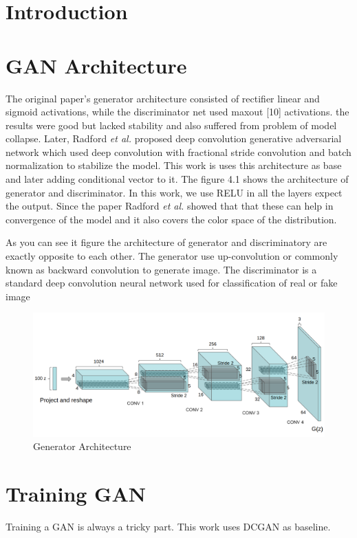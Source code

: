 
\section{Introduction}

\section{GAN Architecture} 

The original paper's\cite{Original-GAN} generator architecture consisted of  rectifier linear\cite{RELU} and sigmoid activations, while the discriminator net used maxout [10] activations. the results were good but lacked stability and also suffered from problem of model collapse.
Later, Radford \textit{et al.}\cite{DCGAN} proposed deep convolution generative adversarial network which used deep convolution with fractional stride convolution and batch normalization to stabilize the model. This work is uses this architecture as base and later adding conditional vector to it. The figure 4.1 shows the architecture of generator and discriminator. In this work, we use RELU
in all the layers expect the output. Since the paper Radford \textit{et al.}\cite{DCGAN} showed that that these can help in convergence of the model and it also covers the color space of the distribution.
\par

As you can see it figure the architecture of generator and discriminatory are exactly opposite to each other. The generator use up-convolution or commonly known as backward convolution to generate image.%
The discriminator is a standard deep convolution neural network used for classification of real or fake image
\begin{figure}
  \centering
    \includegraphics[scale=.7, angle=0]{Files/Generator-Architecture.png}
    \caption[Generator Architecture]{Generator Architecture\cite{DCGAN}}
    \label{fig: DCGAN}
\end{figure}

\section{Training GAN}

Training a GAN is always a tricky part. This work uses DCGAN\cite{DCGAN} as baseline. 